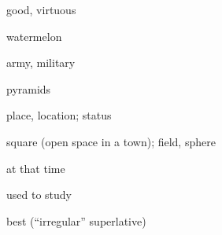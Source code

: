 \documentclass[avery5371,grid,frame]{flashcards}
\begin{document}
\begin{flashcard}{\LARGE good, virtuous}
\LARGE {}
\end{flashcard}
\begin{flashcard}{\LARGE watermelon}
\LARGE {}
\end{flashcard}
\begin{flashcard}{\LARGE army, military}
\LARGE {}
\end{flashcard}
\begin{flashcard}{\LARGE pyramids}
\LARGE {}
\end{flashcard}
\begin{flashcard}{\LARGE place, location; status}
\LARGE {}
\end{flashcard}
\begin{flashcard}{\LARGE square (open space in a town); field, sphere}
\LARGE {}
\end{flashcard}
\begin{flashcard}{\LARGE at that time}
\LARGE {}
\end{flashcard}
\begin{flashcard}{\LARGE used to study}
\LARGE {}
\end{flashcard}
\begin{flashcard}{\LARGE best (``irregular'' superlative)}
\LARGE {}
\end{flashcard}
\end{document}
